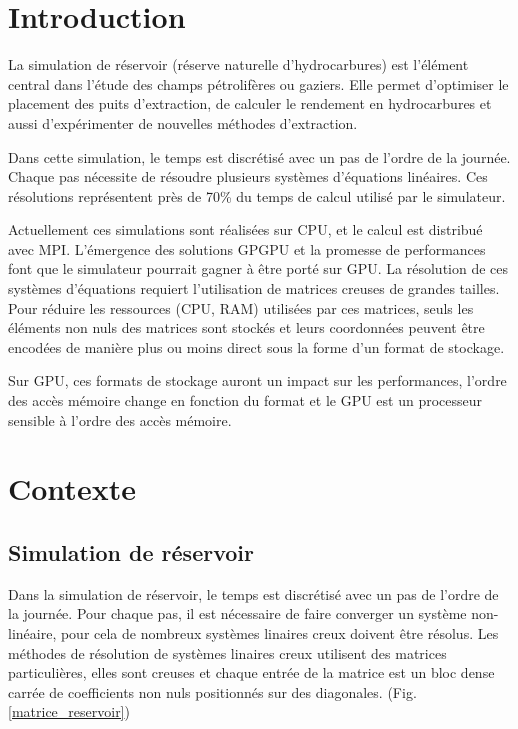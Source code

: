 \documentclass[renpar]{compas2013}
\begin{document}
\section{Introduction}
 La simulation de réservoir (réserve naturelle d'hydrocarbures) est l'élément
 central dans l'étude des champs pétrolifères ou gaziers. Elle permet d'optimiser
 le placement des puits d'extraction, de calculer le rendement en hydrocarbures et aussi
 d'expérimenter de nouvelles méthodes d'extraction.
 
 Dans cette simulation, le temps est discrétisé avec un pas de l'ordre de la journée.
 Chaque pas nécessite de résoudre plusieurs systèmes d'équations linéaires.
 Ces résolutions représentent près de 70\% du temps de calcul utilisé
 par le simulateur.
 
 Actuellement ces simulations sont réalisées sur CPU, et le calcul est distribué avec MPI.
 L'émergence des solutions GPGPU et la promesse de performances font que le simulateur
 pourrait gagner à être porté sur GPU. La résolution de ces systèmes d'équations requiert
 l'utilisation de matrices creuses de grandes tailles. Pour réduire les ressources (CPU, RAM)
 utilisées par ces
 matrices, seuls les éléments non nuls des matrices sont stockés et leurs coordonnées
 peuvent être encodées de manière plus ou moins direct sous la forme d'un format de
 stockage.

 Sur GPU, ces formats de stockage auront un impact sur les performances,
 l'ordre des accès mémoire change en fonction du format et le GPU est
 un processeur sensible à l'ordre des accès mémoire.


\section{Contexte}
 \subsection{Simulation de réservoir} 
  Dans la simulation de réservoir, le temps est discrétisé avec un pas
  de l'ordre de la journée. Pour
  chaque pas, il est nécessaire de faire converger un système
  non-linéaire, pour cela de nombreux systèmes linaires creux doivent
  être résolus. Les méthodes de résolution de systèmes linaires creux
  utilisent des matrices particulières, elles sont creuses
  et chaque entrée de la matrice est un bloc dense carrée de coefficients
  non nuls positionnés sur des diagonales. (Fig. \ref{matrice_reservoir})
  
\end{document}
